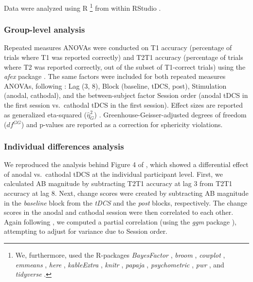 \documentclass[11pt,]{memoir}
\let\rmarkdownfootnote\footnote%
\def\footnote{\protect\rmarkdownfootnote}
\begin{document}
Data were analyzed using R \autocite[Version 3.5.1;][]{R-base}\footnote{We, furthermore, used the R-packages \emph{BayesFactor} \autocite[Version 0.9.12.4.2;][]{R-BayesFactor}, \emph{broom} \autocite[Version 0.5.1;][]{R-broom}, \emph{cowplot} \autocite[Version 0.9.99;][]{R-cowplot}, \emph{emmeans} \autocite[Version 1.3.0;][]{R-emmeans}, \emph{here} \autocite[Version 0.1;][]{R-here}, \emph{kableExtra} \autocite[Version 1.1.0;][]{R-kableExtra}, \emph{knitr} \autocite[Version 1.21;][]{R-knitr}, \emph{papaja} \autocite[Version 0.1.0.9842;][]{R-papaja}, \emph{psychometric} \autocite[Version 2.2;][]{R-psychometric}, \emph{pwr} \autocite[Version 1.2.2;][]{R-pwr}, and \emph{tidyverse} \autocite[Version 1.2.1;][]{R-tidyverse}.} from within RStudio \autocite[Version 1.1.463;][]{RStudio2016}.

\hypertarget{group-level-analysis}{%
\subsubsection{Group-level analysis}\label{group-level-analysis}}

Repeated measures ANOVAs were conducted on T1 accuracy (percentage of trials where T1 was reported correctly) and T2\textbar{}T1 accuracy (percentage of trials where T2 was reported correctly, out of the subset of T1-correct trials) using the \emph{afex} package \autocite[Version 0.22-1;][]{R-afex}. The same factors were included for both repeated measures ANOVAs, following \textcite{London2015}: Lag (3, 8), Block (baseline, tDCS, post), Stimulation (anodal, cathodal), and the between-subject factor Session order (anodal tDCS in the first session vs.~cathodal tDCS in the first session). Effect sizes are reported as generalized eta-squared (\(\hat{\eta}^2_G\)) \autocite{Bakeman2005}. Greenhouse-Geisser-adjusted degrees of freedom (\(\mathit{df}^{GG}\)) and p-values are reported as a correction for sphericity violations.

\hypertarget{AB_tDCS-ind-diffs}{%
\subsubsection{Individual differences analysis}\label{AB_tDCS-ind-diffs}}

We reproduced the analysis behind Figure 4 of \textcite{London2015}, which showed a differential effect of anodal vs.~cathodal tDCS at the individual participant level. First, we calculated AB magnitude by subtracting T2\textbar{}T1 accuracy at lag 3 from T2\textbar{}T1 accuracy at lag 8. Next, change scores were created by subtracting AB magnitude in the \emph{baseline} block from the \emph{tDCS} and the \emph{post} blocks, respectively. The change scores in the anodal and cathodal session were then correlated to each other. Again following \textcite{London2015}, we computed a partial correlation (using the \emph{ggm} package \autocite[Version 2.3;][]{R-ggm}), attempting to adjust for variance due to Session order.
\end{document}
